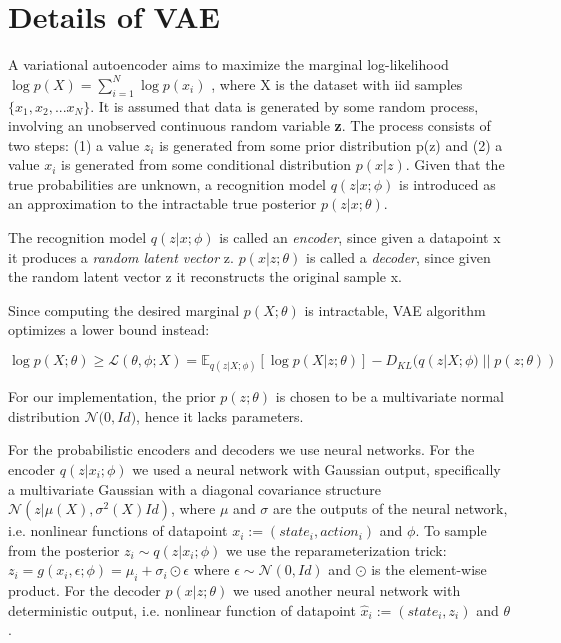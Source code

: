 \section{Details of VAE}

A variational autoencoder aims to maximize the marginal log-likelihood $\log p(X) = \sum_{i=1}^{N}\log p(x_i)$
, where X is the dataset with iid samples $\{x_{1},x_2,...x_N\}$.
It is assumed that data is generated by some random process, involving an unobserved continuous
random variable \textbf{z}.
The process consists of two steps: (1) a value \textbf{$z_i$} is generated from some prior distribution p(z) and (2)
a value $x_i$ is generated from some conditional distribution $p(x|z)$.
Given that the true probabilities are unknown, a recognition model $q(z|x; \phi )$ is introduced
as an approximation to the intractable true posterior $p(z|x; \theta)$.

The recognition model $q(z|x; \phi)$ is called an \textit{encoder},  since given a datapoint x it produces
a \textit{random latent vector} z.
$p(x|z; \theta)$ is called a \textit{decoder},
since given the random latent vector z it reconstructs the original sample x.

Since computing the desired marginal $p(X; \theta)$ is intractable, VAE algorithm optimizes a lower bound instead:

\begin{equation}
    \log p(X; \theta) \geq \mathcal{L}(\theta, \phi; X) = \mathbb E_{q(z|X;\phi)} [\log p(X|z; \theta)] - D_{KL}(q(z|X;\phi)\; ||\;p(z; \theta))
\end{equation}

For our implementation, the prior $p(z; \theta)$ is chosen to be a multivariate normal
distribution $\mathcal{N}\big( 0,Id\big )$, hence it lacks parameters.

For the probabilistic encoders and decoders we use neural networks.
For the encoder $q(z|x_i;\phi)$ we used a neural network with  Gaussian output, specifically a 
multivariate Gaussian with a diagonal covariance structure $\mathcal{N}(z | \mu(X), \sigma^2(X)Id)$,
where $\mu$ and $\sigma$ are the outputs of the neural network, i.e. nonlinear 
functions of datapoint $x_i:=(state_i,action_i)$ and $\phi$.
To sample from the posterior $z_i \sim q(z|x_i; \phi)$ we use the reparameterization trick:
$z_i = g(x_i, \epsilon; \phi)=\mu_i + \sigma_i \odot \epsilon$ where $\epsilon \sim  \mathcal{N}(0,Id)$
and $\odot$ is the element-wise product.
For the decoder $p(x|z; \theta)$ we used another neural network with deterministic output, i.e. nonlinear function of 
datapoint $\hat x_i:=(state_i,z_i)$ and $\theta$.



